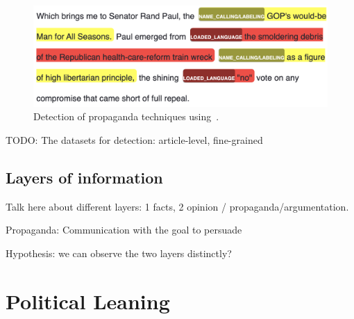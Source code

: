 \begin{figure}[!htb]
    \centering
    \includegraphics[width=\linewidth]{figures/propaganda_example_1_color.png}
    \caption{Detection of propaganda techniques using~\citet{baly2020we}.%
    }
    \label{fig:propaganda_example_1}
\end{figure}



TODO: The datasets for detection: article-level, fine-grained

\subsection{Layers of information}
\label{ssec:lit_layers_of_info}

Talk here about different layers: 1 facts, 2 opinion / propaganda/argumentation.

Propaganda: Communication with the goal to persuade

Hypothesis: we can observe the two layers distinctly?

\section{Political Leaning}
\label{sec:lit_leaning}


